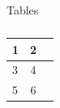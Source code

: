 \documentclass{beamer}
\begin{document}



\begin{frame}{Tables}
	\begin{table}[hbt]
		\begin{tabular}{l|cc}
			1& 2& \\
			\hline
			3& 4& \\
			5& 6&
		\end{tabular}
		\caption{}
	\end{table}
	
\end{frame}
\end{document}
